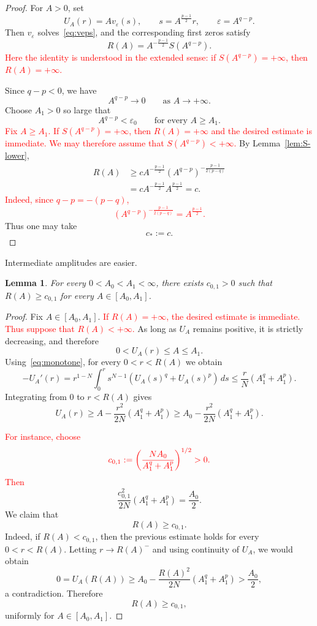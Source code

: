 \documentclass[11pt]{article}
\newtheorem{lemma}[theorem]{Lemma}
\theoremstyle{definition}
\begin{document}
\begin{proof}
For $A>0$, set
\[
U_A(r)
=
A v_\varepsilon(s),
\qquad
s=A^{\frac{p-1}{2}}r,
\qquad
\varepsilon=A^{q-p}.
\]
Then $v_\varepsilon$ solves~\eqref{eq:veps}, and the corresponding
first zeros satisfy
\begin{equation}
\label{eq:R-S}
R(A)
=
A^{-\frac{p-1}{2}}
S(A^{q-p}).
\end{equation}
\textcolor{red}{Here the identity is understood in the extended
sense: if $S(A^{q-p})=+\infty$, then $R(A)=+\infty$.}

Since $q-p<0$, we have
\[
A^{q-p}\longrightarrow0
\qquad
\text{as }A\to+\infty.
\]
Choose $A_1>0$ so large that
\[
A^{q-p}<\varepsilon_0
\qquad
\text{for every }A\geq A_1.
\]
\textcolor{red}{Fix $A\geq A_1$. If
$S(A^{q-p})=+\infty$, then $R(A)=+\infty$ and the desired estimate
is immediate. We may therefore assume that
$S(A^{q-p})<+\infty$.}
By Lemma~\ref{lem:S-lower},
\begin{align*}
R(A)
&\geq
c
A^{-\frac{p-1}{2}}
\left(A^{q-p}\right)^{-\frac{p-1}{2(p-q)}}
\\
&=
c
A^{-\frac{p-1}{2}}
A^{\frac{p-1}{2}}
=
c.
\end{align*}
\textcolor{red}{Indeed, since $q-p=-(p-q)$,
\[
\left(A^{q-p}\right)^{-\frac{p-1}{2(p-q)}}
=
A^{\frac{p-1}{2}}.
\]}
Thus one may take
\[
c_*:=c.
\]
\end{proof}

Intermediate amplitudes are easier.

\begin{lemma}
\label{lem:intermediate}
For every $0<A_0<A_1<\infty$, there exists $c_{0,1}>0$ such that
\(
R(A)\geq c_{0,1}
\)
for every \(A\in[A_0,A_1]\).
\end{lemma}

\begin{proof}
Fix $A\in[A_0,A_1]$.
\textcolor{red}{If $R(A)=+\infty$, the desired estimate is immediate.
Thus suppose that $R(A)<+\infty$.}
As long as $U_A$ remains positive, it is
strictly decreasing, and therefore
\[
0<U_A(r)\leq A\leq A_1.
\]
Using~\eqref{eq:monotone}, for every $0<r<R(A)$ we obtain
\[
-U_A'(r)
=
r^{1-N}
\int_0^r
s^{N-1}
\left(
U_A(s)^q+U_A(s)^p
\right)\,ds
\leq
\frac{r}{N}
\left(A_1^q+A_1^p\right).
\]
Integrating from $0$ to $r<R(A)$ gives
\[
U_A(r)
\geq
A
-
\frac{r^2}{2N}
\left(A_1^q+A_1^p\right)
\geq
A_0
-
\frac{r^2}{2N}
\left(A_1^q+A_1^p\right).
\]

\textcolor{red}{For instance, choose}
\[
\textcolor{red}{
c_{0,1}
:=
\left(
\frac{N A_0}{A_1^q+A_1^p}
\right)^{1/2}>0.
}
\]
\textcolor{red}{Then}
\[
\frac{c_{0,1}^2}{2N}
\left(A_1^q+A_1^p\right)
=
\frac{A_0}{2}.
\]
We claim that
\[
R(A)\geq c_{0,1}.
\]
Indeed, if $R(A)<c_{0,1}$, then the previous estimate holds for every
$0<r<R(A)$. Letting $r\to R(A)^-$ and using continuity of $U_A$, we
would obtain
\[
0=U_A(R(A))
\geq
A_0
-
\frac{R(A)^2}{2N}
\left(A_1^q+A_1^p\right)
>
\frac{A_0}{2},
\]
a contradiction. Therefore
\[
R(A)\geq c_{0,1},
\]
uniformly for $A\in[A_0,A_1]$.
\end{proof}
\end{document}
